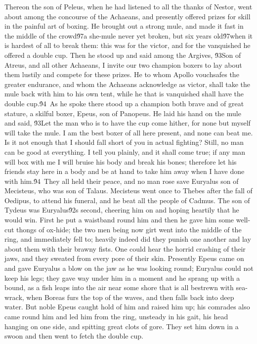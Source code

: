 {Thereon the son of Peleus, when he had listened to all the thanks of Nestor, went about among the concourse of the Achaeans, and presently offered prizes for skill in the painful art of boxing. He brought out a strong mule, and made it fast in the middle of the crowd\'97a she-mule never yet broken, but six years old\'97when it is hardest of all to break them: this was for the victor, and for the vanquished he offered a double cup. Then he stood up and said among the Argives, \'93Son of Atreus, and all other Achaeans, I invite our two champion boxers to lay about them lustily and compete for these prizes. He to whom Apollo vouchsafes the greater endurance, and whom the Achaeans acknowledge as victor, shall take the mule back with him to his own tent, while he that is vanquished shall have the double cup.\'94\
As he spoke there stood up a champion both brave and of great stature, a skilful boxer, Epeus, son of Panopeus. He laid his hand on the mule and said, \'93Let the man who is to have the cup come hither, for none but myself will take the mule. I am the best boxer of all here present, and none can beat me. Is it not enough that I should fall short of you in actual fighting? Still, no man can be good at everything. I tell you plainly, and it shall come true; if any man will box with me I will bruise his body and break his bones; therefore let his friends stay here in a body and be at hand to take him away when I have done with him.\'94\
They all held their peace, and no man rose save Euryalus son of Mecisteus, who was son of Talaus. Mecisteus went once to Thebes after the fall of Oedipus, to attend his funeral, and he beat all the people of Cadmus. The son of Tydeus was Euryalus\'92s second, cheering him on and hoping heartily that he would win. First he put a waistband round him and then he gave him some well-cut thongs of ox-hide; the two men being now girt went into the middle of the ring, and immediately fell to; heavily indeed did they punish one another and lay about them with their brawny fists. One could hear the horrid crashing of their jaws, and they sweated from every pore of their skin. Presently Epeus came on and gave Euryalus a blow on the jaw as he was looking round; Euryalus could not keep his legs; they gave way under him in a moment and he sprang up with a bound, as a fish leaps into the air near some shore that is all bestrewn with sea-wrack, when Boreas furs the top of the waves, and then falls back into deep water. But noble Epeus caught hold of him and raised him up; his comrades also came round him and led him from the ring, unsteady in his gait, his head hanging on one side, and spitting great clots of gore. They set him down in a swoon and then went to fetch the double cup.\
}
